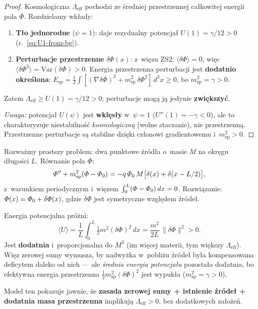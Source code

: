\begin{proof}
Kosmologiczna $\Lambda_{\mathrm{eff}}$ pochodzi ze \'sredniej
przestrzennej ca\l{}kowitej energii pola $\Phi$. Rozdzielamy
wk\l{}ady:
\begin{enumerate}[nosep]
  \item \textbf{T\l{}o jednorodne} ($\psi = 1$): daje
    rezydualny potencja\l{} $U(1) = \gamma/12 > 0$
    (r.~\ref{eq:U1-from-bg}).
  \item \textbf{Perturbacje przestrzenne} $\delta\Phi(x)$:
    z~wi\k{e}zu ZS2: $\langle\delta\Phi\rangle = 0$,
    wi\k{e}c $\langle\delta\Phi^2\rangle = \mathrm{Var}(\delta\Phi) > 0$.
    Energia przestrzenna perturbacji jest \textbf{dodatnio
    okre\'slona}: $E_{\mathrm{sp}} = \frac{1}{2}\int
    [(\nabla\delta\Phi)^2 + m_{\mathrm{sp}}^2\,\delta\Phi^2]\,d^3x
    \geq 0$, bo $m_{\mathrm{sp}}^2 = \gamma > 0$.
\end{enumerate}
Zatem $\Lambda_{\mathrm{eff}} \geq U(1) = \gamma/12 > 0$;
perturbacje mog\k{a} j\k{a} jedynie \textbf{zwi\k{e}kszy\'c}.

\medskip\noindent
\emph{Uwaga:} potencja\l{} $U(\psi)$ jest \textbf{wkl\k{e}s\l{}y}
w~$\psi = 1$ ($U''(1) = -\gamma < 0$), ale to charakteryzuje
niestabilno\'s\'c \emph{kosmologiczn\k{a}} (wolne staczanie), nie
przestrzenn\k{a}. Przestrzenne perturbacje s\k{a} stabilne
dzi\k{e}ki cz\l{}onowi gradientowemu i~$m_{\mathrm{sp}}^2 > 0$.
\end{proof}

\begin{remark}\label{rem:toy-Lambda}
Rozwa\.zmy prostszy problem: dwa punktowe \'zr\'od\l{}a
o~masie $M$ na okr\k{e}gu d\l{}ugo\'sci $L$. R\'ownanie
pola $\Phi$:
\[
  \varPhi'' + m_{\mathrm{sp}}^2(\varPhi - \varPhi_0)
  = -q\,\varPhi_0\,M\bigl[\delta(x) + \delta(x - L/2)\bigr],
\]
z~warunkiem periodycznym i~wi\k{e}zem
$\int_0^L (\varPhi - \varPhi_0)\,dx = 0$.
Rozwi\k{a}zanie: $\varPhi(x) = \varPhi_0 + \delta\varPhi(x)$,
gdzie $\delta\Phi$ jest symetryczne wzgl\k{e}dem \'zr\'ode\l{}.

Energia potencjalna pr\'o\.zni:
\[
  \langle U \rangle
  = \frac{1}{L}\int_0^L \tfrac{1}{2}m^2(\delta\Phi)^2\,dx
  = \frac{m^2}{2L}\,\bigl\|\delta\Phi\bigr\|^2 > 0.
\]
Jest \textbf{dodatnia} i~proporcjonalna do $M^2$ (im wi\k{e}cej
materii, tym wi\k{e}kszy $\Lambda_{\mathrm{eff}}$).
Wi\k{e}z zerowej sumy wymusza, by nadwy\.zka w~pobli\.zu
\'zr\'ode\l{} by\l{}a kompensowana deficytem daleko od nich ---
ale \emph{\'srednia energia potencja\l{}u} pozosta\l{}a
dodatnia, bo efektywna energia przestrzenna
$\tfrac{1}{2}m_{\mathrm{sp}}^2(\delta\Phi)^2$ jest wypuk\l{}a
($m_{\mathrm{sp}}^2 = \gamma > 0$).

Model ten pokazuje jawnie, \.ze \textbf{zasada zerowej sumy +
istnienie \'zr\'ode\l{} + dodatnia masa przestrzenna} implikuj\k{a}
$\Lambda_{\mathrm{eff}} > 0$, bez dodatkowych za\l{}o\.ze\'n.
\end{remark}

